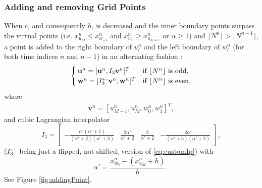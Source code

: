 \subsubsection{Adding and removing Grid Points}
When $c$, and consequently $h$, is decreased and the inner boundary points surpass the virtual points (i.e. $x_{u_M}^n \leq x_{w_{-1}}^n$ and $x_{w_0}^n \geq x_{u_{M+1}}^n$ or $
\alpha \geq 1$) and $\lfloor N^n\rfloor > \lfloor N^{n-1}\rfloor$, a point is added to the right boundary of $u_l^n$ and the left boundary of $w_l^n$ (for both time indices $n$ and $n-1$) in an alternating fashion : 
\begin{equation}\label{eq:addingPoint}
        \begin{cases}\mathbf{u}^n = [\mathbf{u}^n, I_3\mathbf{v}^n]^T & \text{if $\lfloor N^n\rfloor $ is odd},\\
        \mathbf{w}^n = [I_3^\leftarrow\mathbf{v}^n, \mathbf{w}^n]^T & \text{if $\lfloor N^n\rfloor$ is even},
        \end{cases}
\end{equation}
where 
\begin{align*}
\mathbf{v}^n = [u_{M-1}^n, u_M^n, w_0^n, w_1^n]^T,%
\end{align*}
and cubic Lagrangian interpolator
\begin{equation}\label{eq:customIp}
    I_3 = \begin{bmatrix} -\frac{\alpha'(\alpha'+1)}{(\alpha'+2)(\alpha'+3)} &\frac{2\alpha'}{\alpha'+2} &\frac{2}{\alpha'+2} 
    &-\frac{2\alpha'}{(\alpha'+3)(\alpha'+2)}
    \end{bmatrix},
\end{equation}
($I_3^\leftarrow$ being just a flipped, not shifted, version of \eqref{eq:customIp}) with
\begin{equation*}
    \alpha' = \frac{x_{w_0}^n - (x_{u_M}^n + h)}{h}\ .
\end{equation*}
See Figure \ref{fig:addingPoint}.

